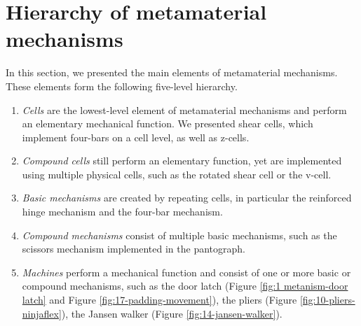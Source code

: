 \section{Hierarchy of metamaterial mechanisms}

In this section, we presented the main elements of metamaterial mechanisms. These elements form the following five-level hierarchy.

\begin{enumerate}
    \item \textit{Cells} are the lowest-level element of metamaterial mechanisms and perform an elementary mechanical function. We presented shear cells, which implement four-bars on a cell level, as well as z-cells.
    \item \textit{Compound cells} still perform an elementary function, yet are implemented using multiple physical cells, such as the rotated shear cell or the v-cell.
    \item \textit{Basic mechanisms} are created by repeating cells, in particular the reinforced hinge mechanism and the four-bar mechanism.
    \item \textit{Compound mechanisms} consist of multiple basic mechanisms, such as the scissors mechanism implemented in the pantograph.
    \item \textit{Machines} perform a mechanical function and consist of one or more basic or compound mechanisms, such as the door latch (Figure \ref{fig:1 metanism-door latch} and Figure \ref{fig:17-padding-movement}), the pliers (Figure \ref{fig:10-pliers-ninjaflex}), the Jansen walker (Figure \ref{fig:14-jansen-walker}).
    
\end{enumerate}






